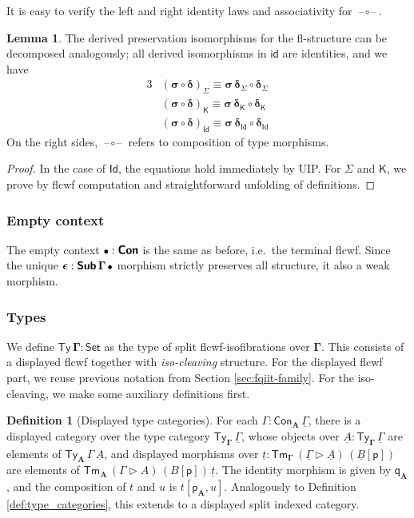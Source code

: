 \documentclass[12pt,a4paper,twoside,openany]{book}
\theoremstyle{remark}
\theoremstyle{definition}
\newtheorem{mydefinition}{Definition}
\newtheorem{mylemma}{Lemma}
\theoremstyle{theorem}
\newcommand{\bs}[1]{\boldsymbol{#1}}
\newcommand{\id}{\mathsf{id}}
\newcommand{\Con}{\mathsf{Con}}
\newcommand{\Sub}{\mathsf{Sub}}
\newcommand{\Tm}{\mathsf{Tm}}
\newcommand{\Ty}{\mathsf{Ty}}
\newcommand{\Id}{\mathsf{Id}}
\newcommand{\blank}{\mathord{\hspace{1pt}\text{--}\hspace{1pt}}}
\newcommand{\Set}{\mathsf{Set}}
\newcommand{\ext}{\triangleright}
\newcommand{\p}{\mathsf{p}}
\newcommand{\q}{\mathsf{q}}
\newcommand{\K}{\mathsf{K}}
\newcommand{\bCon}{\bs{\Con}}
\newcommand{\bSub}{\bs{\Sub}}
\newcommand{\bGamma}{\bs{\Gamma}}
\newcommand{\bsigma}{\bs{\sigma}}
\newcommand{\bdelta}{\bs{\delta}}
\newcommand{\bA}{\bs{A}}
\newcommand{\bid}{\bs{\id}}
\newcommand{\bemptycon}{\scaleobj{.75}{\bs{\bullet}}}
\newcommand{\ul}[1]{\underline{#1}}
\newcommand{\ulGamma}{\ul{\Gamma}}
\newcommand{\ult}{\ul{t}}
\newcommand{\ulA}{\ul{A}}
\newcommand{\ulB}{\ul{B}}
\begin{document}
It is easy to verify the left and right identity laws and associativity for
$\bs{\blank\circ\blank}$.

\begin{mylemma}\label{lem:idcomppres}
The derived preservation isomorphisms for the fl-structure can be decomposed
analogously; all derived isomorphisms in $\bid$ are identities, and we have
\begin{alignat*}{3}
  & (\bs{\sigma \circ \delta})_{\Sigma} \equiv
  \bsigma\,\bdelta_{\Sigma} \circ \bdelta_{\Sigma}\\
  & (\bs{\sigma \circ \delta})_{\K} \equiv
  \bsigma\,\bdelta_{\K} \circ \bdelta_{\K}\\
  & (\bs{\sigma \circ \delta})_{\Id} \equiv
  \bsigma\,\bdelta_{\Id} \circ \bdelta_{\Id}
\end{alignat*}
On the right sides, $\blank\circ\blank$ refers to composition of type morphisms.
\end{mylemma}
\begin{proof}
In the case of $\Id$, the equations hold immediately by UIP. For $\Sigma$ and
$\K$, we prove by flcwf computation and straightforward unfolding of
definitions.
\end{proof}

\subsubsection{Empty context}
The empty context $\bemptycon : \bCon$ is the same as before, i.e.\ the terminal
flcwf. Since the unique $\bs{\epsilon} : \bSub\,\bGamma\,\bemptycon$ morphism
strictly preserves all structure, it also a weak morphism.

\subsubsection{Types}
We define $\bs{\Ty\,\Gamma} : \Set$ as the type of split flcwf-isofibrations
over $\bGamma$. This consists of a displayed flcwf together with \emph{iso-cleaving}
structure. For the displayed flcwf part, we reuse previous notation from Section
\ref{sec:fqiit-family}. For the iso-cleaving, we make some auxiliary definitions first.

\begin{mydefinition}[Displayed type categories]
For each $\Gamma : \Con_{\bA}\,\ulGamma$, there is a displayed category over the
type category $\Ty_{\bGamma}\,\ulGamma$, whose objects over $\ulA :
\Ty_{\bGamma}\,\ulGamma$ are elements of $\Ty_{\bA}\,\Gamma\,\ulA$, and
displayed morphisms over $\ult : \Tm_{\bGamma}\,(\ulGamma \ext
\ulA)\,(\ulB[\p])$ are elements of $\Tm_{\bA}\,(\Gamma \ext
A)\,(B[\p])\,\ult$. The identity morphism is given by $\q_{\bA}$, and the
composition of $t$ and $u$ is $t[\p_{\bA},u]$. Analogously to Definition
\ref{def:type_categories}, this extends to a displayed split indexed category.
\end{mydefinition}
\end{document}

